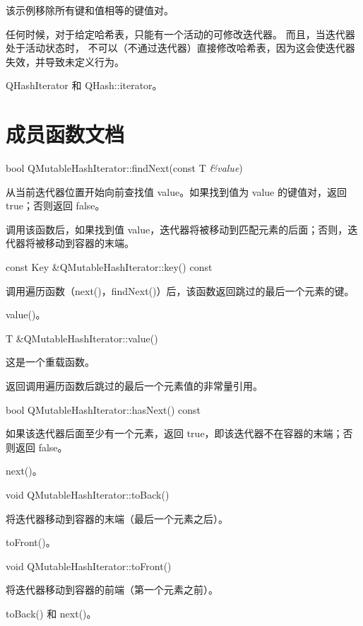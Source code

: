 该示例移除所有键和值相等的键值对。

任何时候，对于给定哈希表，只能有一个活动的可修改迭代器。
而且，当迭代器处于活动状态时，
不可以（不通过迭代器）直接修改哈希表，因为这会使迭代器失效，并导致未定义行为。

\begin{seeAlso}
QHashIterator 和 QHash::iterator。
\end{seeAlso}

\section{成员函数文档}


bool QMutableHashIterator::findNext(const T \emph{\&value})

从当前迭代器位置开始向前查找值 value。如果找到值为 value 的键值对，返回 true；否则返回 false。

调用该函数后，如果找到值 value，迭代器将被移动到匹配元素的后面；否则，迭代器将被移动到容器的末端。

const Key \&QMutableHashIterator::key() const

调用遍历函数（next()，findNext()）后，该函数返回跳过的最后一个元素的键。

\begin{seeAlso}
value()。
\end{seeAlso}

T \&QMutableHashIterator::value()

这是一个重载函数。

返回调用遍历函数后跳过的最后一个元素值的非常量引用。

bool QMutableHashIterator::hasNext() const

如果该迭代器后面至少有一个元素，返回 true，即该迭代器不在容器的末端；否则返回 false。

\begin{seeAlso}
next()。
\end{seeAlso}

void QMutableHashIterator::toBack()

将迭代器移动到容器的末端（最后一个元素之后）。

\begin{seeAlso}
toFront()。
\end{seeAlso}

void QMutableHashIterator::toFront()

将迭代器移动到容器的前端（第一个元素之前）。

\begin{seeAlso}
toBack() 和 next()。
\end{seeAlso}

